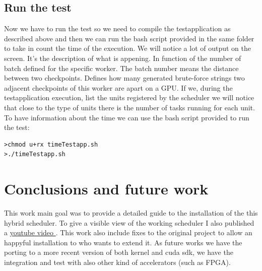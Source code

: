 \documentclass[a4paper,13pt]{article}
\begin{document}
\begin{multicols}{2}
    \subsection{Run the test}
        Now we have to run the test so we need to compile  the testapplication as described above and 
        then we can run the bash script provided in the same folder to take in count the time of the execution.
        We will notice a lot of output on the screen. It's the description of what is appening.
        In function of the number of batch defined for the specific worker. The batch number means the distance
        between two checkpoints. Defines how many generated brute-force strings two adjacent checkpoints of
        this worker are apart on a GPU. If we, during the testapplication execution,  list the units registered 
        by the scheduler  we will notice that close to the type of units there is the number of tasks running
        for each unit.\\
        To have information about the time we can use the bash script provided to run the test:
\begin{lstlisting}
>chmod u+rx timeTestapp.sh
>./timeTestapp.sh
\end{lstlisting}

\section{Conclusions and future work}
This work main goal was to provide a detailed guide to the installation of the this hybrid scheduler.
To give a visible view of the working scheduler I also published a \href{http://www.youtube.com/watch?v=91RHioPsrEs}{ youtube video }.
This work also include fixes to the original project to allow an happyful installation to who wants to extend it.
As future works we have the porting to a more recent version of both kernel and cuda sdk, we have the integration and test
with also other kind of accelerators (such as FPGA).




\end{multicols}
\end{document}
